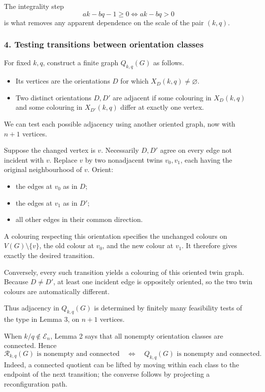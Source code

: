 \documentclass[
  11pt,
  a4paper,
]{article}
\newcounter{none} %
\providecommand{\tightlist}{%
  \setlength{\itemsep}{0pt}\setlength{\parskip}{0pt}}
\begin{document}
The integrality step \[
ak-bq-1\ge0\iff ak-bq>0
\] is what removes any apparent dependence on the scale of the pair
\((k,q)\).

\subsubsection{4. Testing transitions between orientation
classes}\label{testing-transitions-between-orientation-classes}

For fixed \(k,q\), construct a finite graph \(Q_{k,q}(G)\) as follows.

\begin{itemize}
\tightlist
\item
  Its vertices are the orientations \(D\) for which
  \(X_D(k,q)\ne\varnothing\).
\item
  Two distinct orientations \(D,D'\) are adjacent if some colouring in
  \(X_D(k,q)\) and some colouring in \(X_{D'}(k,q)\) differ at exactly
  one vertex.
\end{itemize}

We can test each possible adjacency using another oriented graph, now
with \(n+1\) vertices.

Suppose the changed vertex is \(v\). Necessarily \(D,D'\) agree on every
edge not incident with \(v\). Replace \(v\) by two nonadjacent twins
\(v_0,v_1\), each having the original neighbourhood of \(v\). Orient:

\begin{itemize}
\tightlist
\item
  the edges at \(v_0\) as in \(D\);
\item
  the edges at \(v_1\) as in \(D'\);
\item
  all other edges in their common direction.
\end{itemize}

A colouring respecting this orientation specifies the unchanged colours
on \(V(G)\setminus\{v\}\), the old colour at \(v_0\), and the new colour
at \(v_1\). It therefore gives exactly the desired transition.

Conversely, every such transition yields a colouring of this oriented
twin graph. Because \(D\ne D'\), at least one incident edge is
oppositely oriented, so the two twin colours are automatically
different.

Thus adjacency in \(Q_{k,q}(G)\) is determined by finitely many
feasibility tests of the type in Lemma 3, on \(n+1\) vertices.

When \(k/q\notin\mathcal E_n\), Lemma 2 says that all nonempty
orientation classes are connected. Hence \[
\mathcal R_{k,q}(G)\text{ is nonempty and connected}
\quad\Longleftrightarrow\quad
Q_{k,q}(G)\text{ is nonempty and connected}.
\] Indeed, a connected quotient can be lifted by moving within each
class to the endpoint of the next transition; the converse follows by
projecting a reconfiguration path.
\end{document}
